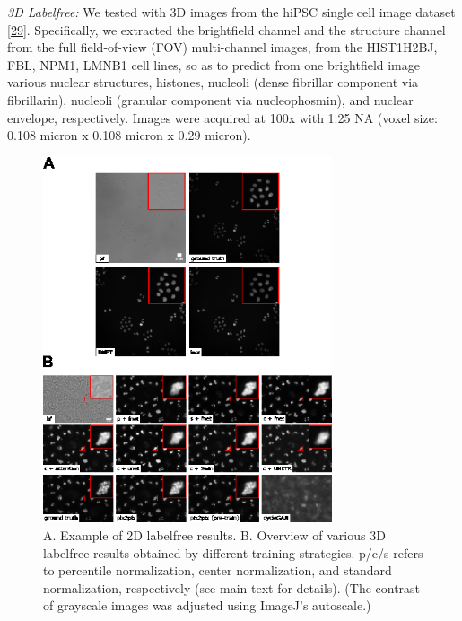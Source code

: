 \emph{3D Labelfree:} We tested with 3D images from the hiPSC single cell image dataset {[}\protect\hyperlink{ref-5sGcmDuy}{29}{]}. Specifically, we extracted the brightfield channel and the structure channel from the full field-of-view (FOV) multi-channel images, from the HIST1H2BJ, FBL, NPM1, LMNB1 cell lines, so as to predict from one brightfield image various nuclear structures, histones, nucleoli (dense fibrillar component via fibrillarin), nucleoli (granular component via nucleophosmin), and nuclear envelope, respectively. Images were acquired at 100x with 1.25 NA (voxel size: 0.108 micron x 0.108 micron x 0.29 micron).

\begin{figure}
\hypertarget{fig:labelfree_comparison}{%
\centering
\includegraphics[width=0.76\textwidth,height=0.9\textheight]{images/labelfree_comparison_justin.png}
\caption{A. Example of 2D labelfree results. B. Overview of various 3D labelfree results obtained by different training strategies. p/c/s refers to percentile normalization, center normalization, and standard normalization, respectively (see main text for details). (The contrast of grayscale images was adjusted using ImageJ's autoscale.)}\label{fig:labelfree_comparison}
}
\end{figure}

